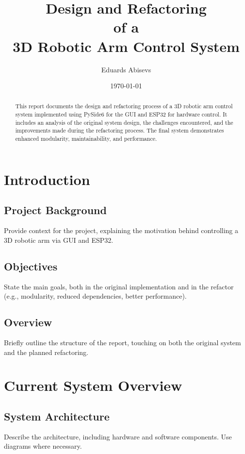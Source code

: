 \documentclass[twocolumn]{article}
\title{Design and Refactoring \\ of a  \\ 3D Robotic Arm Control System}
\author{Eduards Abisevs}
\date{\today}
\begin{document}
\onecolumn
\maketitle

\begin{abstract}
This report documents the design and refactoring process of a 3D robotic arm control system implemented using PySide6 for the GUI and ESP32 for hardware control. It includes an analysis of the original system design, the challenges encountered, and the improvements made during the refactoring process. The final system demonstrates enhanced modularity, maintainability, and performance.
\end{abstract}

\newpage  %
\tableofcontents
\newpage

\twocolumn


\section{Introduction}
\subsection{Project Background}
Provide context for the project, explaining the motivation behind controlling a 3D robotic arm via GUI and ESP32.

\subsection{Objectives}
State the main goals, both in the original implementation and in the refactor (e.g., modularity, reduced dependencies, better performance).

\subsection{Overview}
Briefly outline the structure of the report, touching on both the original system and the planned refactoring.

\section{Current System Overview}
\subsection{System Architecture}
Describe the architecture, including hardware and software components. Use diagrams where necessary.
\end{document}
